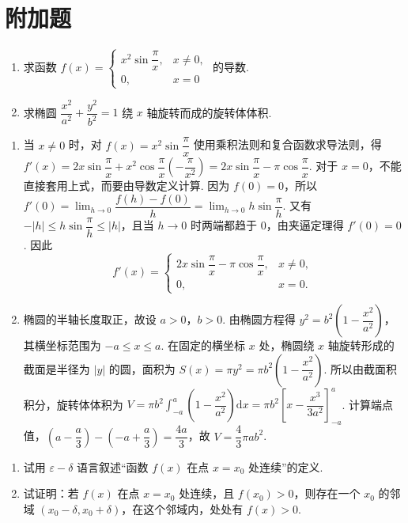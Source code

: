 \section{附加题}

\begin{problem}
\begin{enumerate}
    \item 求函数 \(f(x)=\begin{cases}
    x^2\sin\dfrac{\pi}{x}, & x\ne0,\\
    0, & x=0
    \end{cases}\) 的导数.
    \item 求椭圆 \(\dfrac{x^2}{a^2}+\dfrac{y^2}{b^2}=1\) 绕 \(x\) 轴旋转而成的旋转体体积.
\end{enumerate}
\end{problem}

\begin{solution}
\begin{enumerate}
    \item 当 \(x\ne0\) 时，对 \(f(x)=x^2\sin\dfrac{\pi}{x}\) 使用乘积法则和复合函数求导法则，得 \(f'(x)=2x\sin\dfrac{\pi}{x}+x^2\cos\dfrac{\pi}{x}\left(-\dfrac{\pi}{x^2}\right)=2x\sin\dfrac{\pi}{x}-\pi\cos\dfrac{\pi}{x}\). 对于 \(x=0\)，不能直接套用上式，而要由导数定义计算. 因为 \(f(0)=0\)，所以 \(f'(0)=\displaystyle\lim_{h\to0}\dfrac{f(h)-f(0)}{h}=\lim_{h\to0}h\sin\dfrac{\pi}{h}\). 又有 \(-|h|\leqslant h\sin\dfrac{\pi}{h}\leqslant|h|\)，且当 \(h\to0\) 时两端都趋于 \(0\)，由夹逼定理得 \(f'(0)=0\). 因此
    \[
    f'(x)=\begin{cases}
    2x\sin\dfrac{\pi}{x}-\pi\cos\dfrac{\pi}{x}, & x\ne0,\\
    0, & x=0.
    \end{cases}
    \]
    \item 椭圆的半轴长度取正，故设 \(a>0\)，\(b>0\). 由椭圆方程得 \(y^2=b^2\left(1-\dfrac{x^2}{a^2}\right)\)，其横坐标范围为 \(-a\leqslant x\leqslant a\). 在固定的横坐标 \(x\) 处，椭圆绕 \(x\) 轴旋转形成的截面是半径为 \(\lvert y\rvert\) 的圆，面积为 \(S(x)=\pi y^2=\pi b^2\left(1-\dfrac{x^2}{a^2}\right)\). 所以由截面积积分，旋转体体积为 \(V=\pi b^2\displaystyle\int_{-a}^{a}\left(1-\dfrac{x^2}{a^2}\right)\mathrm{d}x=\pi b^2\left[x-\dfrac{x^3}{3a^2}\right]_{-a}^{a}\). 计算端点值，\(\left(a-\dfrac{a}{3}\right)-\left(-a+\dfrac{a}{3}\right)=\dfrac{4a}{3}\)，故 \(V=\dfrac{4}{3}\pi ab^2\).
\end{enumerate}
\end{solution}

\begin{problem}
\begin{enumerate}
    \item 试用 \(\varepsilon-\delta\) 语言叙述“函数 \(f(x)\) 在点 \(x=x_0\) 处连续”的定义.
    \item 试证明：若 \(f(x)\) 在点 \(x=x_0\) 处连续，且 \(f(x_0)>0\)，则存在一个 \(x_0\) 的邻域 \(\left(x_0-\delta,x_0+\delta\right)\)，在这个邻域内，处处有 \(f(x)>0\).
\end{enumerate}
\end{problem}

